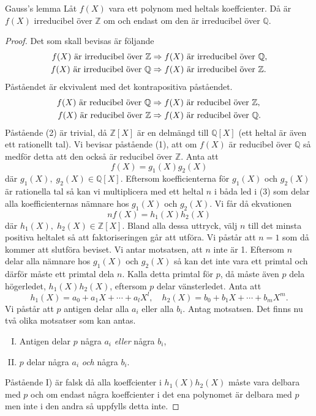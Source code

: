 \documentclass{article}
\theoremstyle{definition}
\begin{document}
\begin{mylemma}{Gauss's lemma}{}
Låt $f(X)$ vara ett polynom med heltals koeffcienter. Då är $f(X)$ irreducibel över $\mathbb{Z}$ om och endast om den är irreducibel över $\mathbb{Q}$.
\end{mylemma}
\begin{proof}
  Det som skall bevisas är följande
  \begin{align*}
    f(X) \textnormal{ är irreducibel över } \mathbb{Z} &\Rightarrow f(X) \textnormal{ är irreducibel över } \mathbb{Q}, \\
    f(X) \textnormal{ är irreducibel över } \mathbb{Q} &\Rightarrow f(X) \textnormal{ är irreducibel över } \mathbb{Z}.
  \end{align*}
  Påståendet är ekvivalent med det kontrapositiva påståendet.
  \begin{align}
    f(X) \textnormal{ är reducibel över } \mathbb{Q} &\Rightarrow f(X) \textnormal{ är reducibel över } \mathbb{Z}, \\
    f(X) \textnormal{ är reducibel över } \mathbb{Z} &\Rightarrow f(X) \textnormal{ är reducibel över } \mathbb{Q}.
  \end{align}
  Påstående (2) är trivial, då $\mathbb{Z}[X]$ är en delmängd till $\mathbb{Q}[X]$ (ett heltal är även ett rationellt tal). Vi bevisar påstående (1),
  att om $f(X)$ är reducibel över $\mathbb{Q}$ så medför detta att den också är reducibel över $\mathbb{Z}$. Anta att
  \begin{equation}
    f(X) = g_1(X)g_2(X)
  \end{equation}
  där $g_1(X), \; g_2(X) \in \mathbb{Q}[X]$. Eftersom koefficienterna för $g_1(X)$ och $g_2(X)$ är rationella tal så kan vi multiplicera med ett
  heltal $n$ i båda led i (3) som delar alla koefficienternas nämnare hos $g_1(X)$ och $g_2(X)$. Vi får då ekvationen
  \begin{equation}
    nf(X) = h_1(X)h_2(X)
  \end{equation}
  där $h_1(X), \; h_2(X) \in \mathbb{Z}[X]$. Bland alla dessa uttryck, välj $n$ till det minsta positiva heltalet
  så att faktoriseringen går att utföra. Vi påstår att $n = 1$ som då kommer att slutföra beviset. Vi antar motsatsen, att $n$ inte är 1. Eftersom 
  $n$ delar alla nämnare hos $g_1(X)$ och $g_2(X)$ så kan det inte vara ett primtal och därför måste ett primtal dela $n$. Kalla detta primtal för $p$, då 
  måste även $p$ dela högerledet, $h_1(X)h_2(X)$, eftersom $p$ delar vänsterledet. Anta att 
  \[h_1(X) = a_0 + a_1X + \cdots + a_lX^l, \quad h_2(X) = b_0 + b_1X + \cdots + b_mX^m.\]
  Vi påstår att $p$ antigen delar alla $a_i$ eller alla $b_i$. Antag motsatsen. Det finns nu två olika motsatser som kan antas.
  \begin{enumerate}[I)]
    \item Antigen delar $p$ några $a_i$ \textit{eller} några $b_i$,
    \item $p$ delar några $a_i$ \textit{och} några $b_i$.
  \end{enumerate}
  Påstående I) är falsk då alla koeffcienter i $h_1(X)h_2(X)$ måste vara delbara med $p$ och om endast några koeffcienter i det ena polynomet 
  är delbara med $p$ men inte i den andra så uppfylls detta inte. 


\end{proof}
\end{document}
